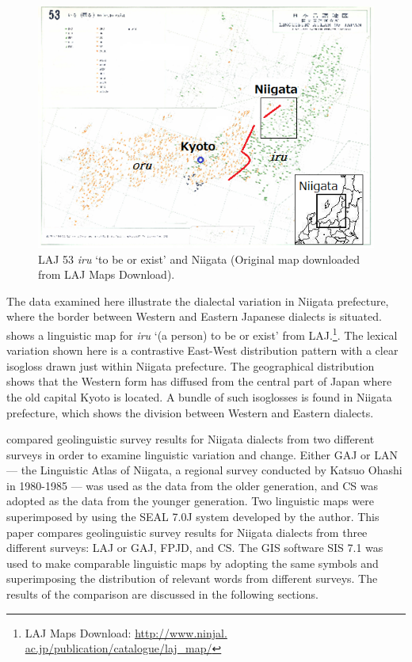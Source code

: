 \documentclass[output=paper]{LSP/langsci}
\begin{document}
\begin{figure}
\includegraphics[width=1\textwidth]{illustrations/fuku2_fig1}
\caption{\textsc{LAJ} 53 \textit{iru} `to be or exist' and Niigata (Original map downloaded from \textsc{LAJ} Maps Download).}
\label{fig:1}
\end{figure}

The data examined here illustrate the dialectal variation in Niigata prefecture, where the border between Western and Eastern Japanese dialects is situated.   shows a linguistic map for \textit{iru} `(a person) to be or exist' from \textsc{LAJ}.\footnote{\textsc{LAJ} Maps Download: \url{http://www.ninjal. ac.jp/publication/catalogue/laj\_map/}}.  The lexical variation shown here is a contrastive East-West distribution pattern with a clear isogloss drawn just within Niigata prefecture.  The geographical distribution shows that the Western form has diffused from the central part of Japan where the old capital Kyoto is located.  A bundle of such isoglosses is found in Niigata prefecture, which shows the division between Western and Eastern dialects.

\citet{fukushima_superimposing_2007} compared geolinguistic survey results for Niigata dialects from two different surveys in order to examine linguistic variation and change.  Either \textsc{GAJ} or LAN --- the Linguistic Atlas of Niigata, a regional survey conducted by Katsuo Ohashi in 1980-1985 \citep{ohashi_linguistic_1998} --- was used as the data from the older generation, and \textsc{CS} was adopted as the data from the younger generation.  Two linguistic maps were superimposed by using the SEAL 7.0J system developed by the author.  This paper compares geolinguistic survey results for Niigata dialects from three different surveys: \textsc{LAJ} or \textsc{GAJ}, \textsc{FPJD}, and \textsc{CS}.  The \textsc{GIS} software SIS 7.1 was used to make comparable linguistic maps by adopting the same symbols and superimposing the distribution of relevant words from different surveys.  The results of the comparison are discussed in the following sections.
\end{document}
